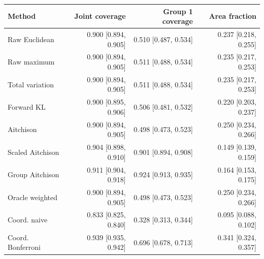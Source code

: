 \begin{tabular}{lrrr}
\toprule
Method & Joint coverage & Group 1 coverage & Area fraction \\
\midrule
Raw Euclidean & 0.900 [0.894, 0.905] & 0.510 [0.487, 0.534] & 0.237 [0.218, 0.255] \\
Raw maximum & 0.900 [0.894, 0.905] & 0.511 [0.488, 0.534] & 0.235 [0.217, 0.253] \\
Total variation & 0.900 [0.894, 0.905] & 0.511 [0.488, 0.534] & 0.235 [0.217, 0.253] \\
Forward KL & 0.900 [0.895, 0.906] & 0.506 [0.481, 0.532] & 0.220 [0.203, 0.237] \\
Aitchison & 0.900 [0.894, 0.905] & 0.498 [0.473, 0.523] & 0.250 [0.234, 0.266] \\
Scaled Aitchison & 0.904 [0.898, 0.910] & 0.901 [0.894, 0.908] & 0.149 [0.139, 0.159] \\
Group Aitchison & 0.911 [0.904, 0.918] & 0.924 [0.913, 0.935] & 0.164 [0.153, 0.175] \\
Oracle weighted & 0.900 [0.894, 0.905] & 0.498 [0.473, 0.523] & 0.250 [0.234, 0.266] \\
Coord. naive & 0.833 [0.825, 0.840] & 0.328 [0.313, 0.344] & 0.095 [0.088, 0.102] \\
Coord. Bonferroni & 0.939 [0.935, 0.942] & 0.696 [0.678, 0.713] & 0.341 [0.324, 0.357] \\
\bottomrule
\end{tabular}
